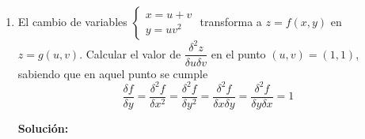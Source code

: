 \documentclass[12pt]{article}
\newenvironment{solucion}
{\begin{mdframed}[backgroundcolor=black!10]
		{\bf Solución:}\\
	}
	{
	\end{mdframed}
}
\newenvironment{preguntas}
{\begin{enumerate}\itemsep12pt
	}
	{
	\end{enumerate}
}
\begin{document}
\begin{preguntas}
\begin{solucion}
\end{solucion}
\item El cambio de variables 
	$\begin{cases}
	x=u+v\\
	y=uv^2
	\end{cases}$
	transforma a $z=f(x,y)$ en $z=g(u,v)$. Calcular el valor de $\dfrac{\delta^2z}{\delta u \delta v}$ en el punto $(u,v) = (1,1)$, sabiendo que en aquel punto se cumple$$\dfrac{\delta f}			{\delta y} = \dfrac{\delta^2 f}{\delta x^2}=\dfrac{\delta^2 f}{\delta y^2}=\dfrac{\delta^2 f}{\delta x \delta y}=\dfrac{\delta^2 f}{\delta y \delta x}=1$$
\begin{solucion}

\end{solucion}
\end{preguntas}
\end{document}
